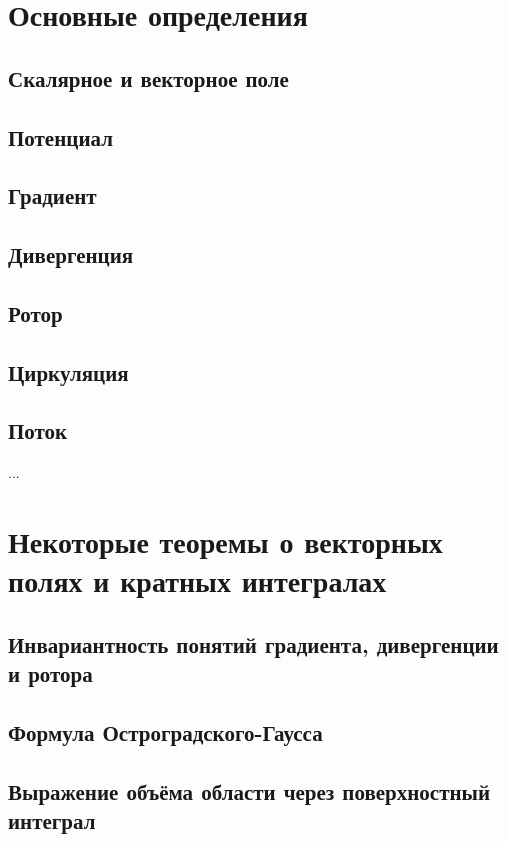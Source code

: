 \section{Основные определения}
\subsection{Скалярное и векторное поле}

\subsection{Потенциал}
%
\subsection{Градиент}
%
\subsection{Дивергенция}
%
\subsection{Ротор}
%
\subsection{Циркуляция}
%
\subsection{Поток}
%
...

\section{Некоторые теоремы о векторных полях и кратных интегралах}
\subsection{Инвариантность понятий градиента, дивергенции и ротора}
\subsection{Формула Остроградского-Гаусса}
\subsection{Выражение объёма области через поверхностный интеграл}
